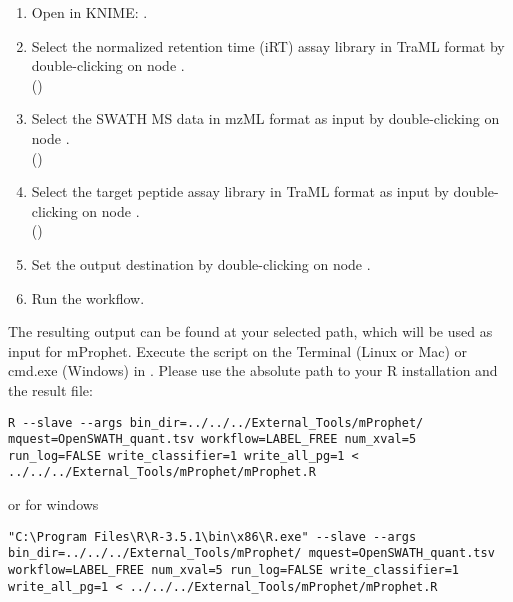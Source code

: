\begin{enumerate}
  \item Open  in KNIME: .
  \item Select the normalized retention time (iRT) assay library in TraML format by double-clicking on node .\\
  ()
  \item Select the SWATH MS data in mzML format as input by double-clicking on node .\\
  ()
  \item Select the target peptide assay library in TraML format  as input by double-clicking on node .\\
  ()
  \item Set the output destination by double-clicking on node .\\
  \item Run the workflow.
\end{enumerate}

\noindent The resulting output can be found at your selected path, which will be used as input for mProphet. Execute the script on the Terminal (Linux or Mac) or cmd.exe (Windows) in . Please use the absolute path to your R installation and the result file:

\begin{code}
\begin{verbatim}
R --slave --args bin_dir=../../../External_Tools/mProphet/ mquest=OpenSWATH_quant.tsv workflow=LABEL_FREE num_xval=5 run_log=FALSE write_classifier=1 write_all_pg=1 < ../../../External_Tools/mProphet/mProphet.R
\end{verbatim}
\end{code}
or for windows
\begin{code}
\begin{verbatim}
"C:\Program Files\R\R-3.5.1\bin\x86\R.exe" --slave --args bin_dir=../../../External_Tools/mProphet/ mquest=OpenSWATH_quant.tsv workflow=LABEL_FREE num_xval=5 run_log=FALSE write_classifier=1 write_all_pg=1 < ../../../External_Tools/mProphet/mProphet.R
\end{verbatim}
\end{code}


